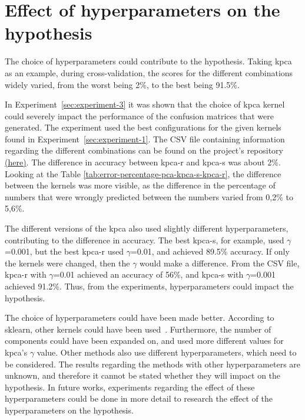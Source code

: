 \section{Effect of hyperparameters on the hypothesis}\label{sec:discussion-hyperparams-hypothesis}
The choice of hyperparameters could contribute to the hypothesis. Taking \gls{kpca} as an example, during cross-validation, the scores for the different combinations widely varied, from the worst being 2\%, to the best being 91.5\%.


In Experiment~\ref{sec:experiment-3} it was shown that the choice of \gls{kpca} kernel could severely impact the performance of the confusion matrices that were generated. The experiment used the best configurations for the given kernels found in Experiment~\ref{sec:experiment-1}. The CSV file containing information regarding the different combinations can be found on the project's repository \href{https://github.com/AAU-Dat/P5-Nonlinear-Dimensionality-Reduction/blob/main/src/results/experiment_one/cross_validation_kernel_pca_svm_15000%20(1).csv}{(here)}. The difference in accuracy between \gls{kpca-r} and \gls{kpca-s} was about 2\%. Looking at the Table \ref{tab:error-percentage-pca-kpca-s-kpca-r}, the difference between the kernels was more visible, as the difference in the percentage of numbers that were wrongly predicted between the numbers varied from 0,2\% to 5,6\%. 


The different versions of the \gls{kpca} also used slightly different hyperparameters, contributing to the difference in accuracy. The best \gls{kpca-s}, for example, used $\gamma$=0.001, but the best \gls{kpca-r} used $\gamma$=0.01, and achieved 89.5\% accuracy. If only the kernels were changed, then the $\gamma$ would make a difference. From the CSV file, \gls{kpca-r} with $\gamma$=0.01 achieved an accuracy of 56\%, and \gls{kpca-s} with $\gamma$=0.001 achieved 91.2\%. Thus, from the experiments, hyperparameters could impact the hypothesis.


The choice of hyperparameters could have been made better. According to \gls{sklearn}, other kernels could have been used~\cite{scikit-learn}. Furthermore, the number of components could have been expanded on, and used more different values for \gls{kpca}'s $\gamma$ value. Other methods also use different hyperparameters, which need to be considered. The results regarding the methods with other hyperparameters are unknown, and therefore it cannot be stated whether they will impact on the hypothesis. In future works, experiments regarding the effect of these hyperparameters could be done in more detail to research the effect of the hyperparameters on the hypothesis.
